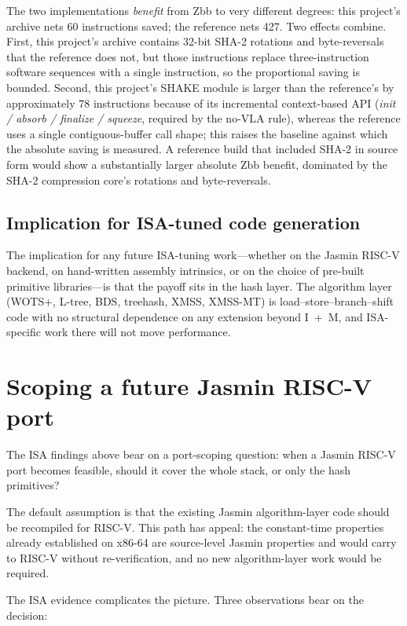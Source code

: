 \documentclass[11pt,a4paper]{article}
\begin{document}
The two implementations \emph{benefit} from Zbb to very different
degrees: this project's archive nets 60 instructions saved; the
reference nets 427. Two effects combine. First, this
project's archive contains 32-bit SHA-2 rotations and byte-reversals
that the reference does not, but those instructions replace
three-instruction software sequences with a single instruction, so
the proportional saving is bounded. Second, this project's SHAKE
module is larger than the reference's by approximately 78
instructions because of its incremental context-based API
(\emph{init / absorb / finalize / squeeze}, required by the no-VLA
rule), whereas the reference uses a single contiguous-buffer call
shape; this raises the baseline against which the absolute saving
is measured. A reference build that included SHA-2 in source form
would show a substantially larger absolute Zbb benefit, dominated
by the SHA-2 compression core's rotations and byte-reversals.

\subsection{Implication for ISA-tuned code generation}

The implication for any future ISA-tuning work---whether on the
Jasmin RISC-V backend, on hand-written assembly intrinsics, or on
the choice of pre-built primitive libraries---is that the payoff
sits in the hash layer. The algorithm layer (WOTS+, L-tree,
BDS, treehash, XMSS, XMSS-MT) is load--store--branch--shift code
with no structural dependence on any extension beyond I~+~M, and
ISA-specific work there will not move performance.

\section{Scoping a future Jasmin RISC-V port}
\label{sec:scoping}

The ISA findings above bear on a port-scoping question: when a
Jasmin RISC-V port becomes feasible, should it cover the whole
stack, or only the hash primitives?

The default assumption is that the existing Jasmin algorithm-layer
code should be recompiled for RISC-V. This path has appeal: the
constant-time properties already established on x86-64 are
source-level Jasmin properties and would carry to RISC-V without
re-verification, and no new algorithm-layer work would be required.

The ISA evidence complicates the picture. Three observations bear
on the decision:
\end{document}
